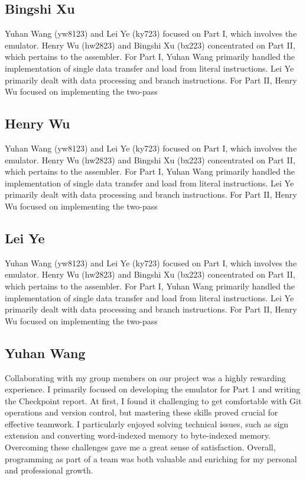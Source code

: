 \documentclass[11pt]{article}
\begin{document}
\subsection{Bingshi Xu}

Yuhan Wang (yw8123) and Lei Ye (ky723) focused on Part I, which involves the emulator. Henry Wu (hw2823) and Bingshi Xu (bx223) concentrated on Part II, which pertains to the assembler.
For Part I, Yuhan Wang primarily handled the implementation of single data transfer and load from literal instructions. Lei Ye primarily dealt with data processing and branch instructions.
For Part II, Henry Wu focused on implementing the two-pass 

\subsection{Henry Wu}

Yuhan Wang (yw8123) and Lei Ye (ky723) focused on Part I, which involves the emulator. Henry Wu (hw2823) and Bingshi Xu (bx223) concentrated on Part II, which pertains to the assembler.
For Part I, Yuhan Wang primarily handled the implementation of single data transfer and load from literal instructions. Lei Ye primarily dealt with data processing and branch instructions.
For Part II, Henry Wu focused on implementing the two-pass 

\subsection{Lei Ye}

Yuhan Wang (yw8123) and Lei Ye (ky723) focused on Part I, which involves the emulator. Henry Wu (hw2823) and Bingshi Xu (bx223) concentrated on Part II, which pertains to the assembler.
For Part I, Yuhan Wang primarily handled the implementation of single data transfer and load from literal instructions. Lei Ye primarily dealt with data processing and branch instructions.
For Part II, Henry Wu focused on implementing the two-pass 

\subsection{Yuhan Wang}
Collaborating with my group members on our project was a highly rewarding 
experience. I primarily focused on developing the emulator for Part 1 and 
writing the Checkpoint report. At first, I found it challenging to get 
comfortable with Git operations and version control, but mastering these 
skills proved crucial for effective teamwork. I particularly enjoyed solving 
technical issues, such as sign extension and converting word-indexed memory 
to byte-indexed memory. Overcoming these challenges gave me a great sense of 
satisfaction. Overall, programming as part of a team was both valuable and 
enriching for my personal and professional growth.
\end{document}
